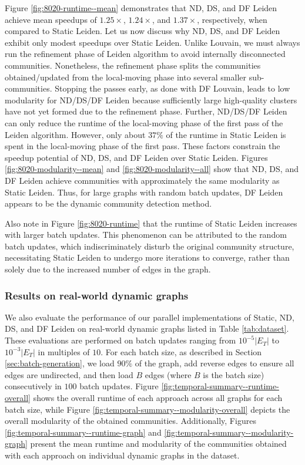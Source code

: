 Figure \ref{fig:8020-runtime--mean} demonstrates that ND, DS, and DF Leiden achieve mean speedups of $1.25\times$, $1.24\times$, and $1.37\times$, respectively, when compared to Static Leiden. Let us now discuss why ND, DS, and DF Leiden exhibit only modest speedups over Static Leiden. Unlike Louvain, we must always run the refinement phase of Leiden algorithm to avoid internally disconnected communities. Nonetheless, the refinement phase splits the communities obtained/updated from the local-moving phase into several smaller sub-communities. Stopping the passes early, as done with DF Louvain, leads to low modularity for ND/DS/DF Leiden because sufficiently large high-quality clusters have not yet formed due to the refinement phase. Further, ND/DS/DF Leiden can only reduce the runtime of the local-moving phase of the first pass of the Leiden algorithm. However, only about $37\%$ of the runtime in Static Leiden is spent in the local-moving phase of the first pass. These factors constrain the speedup potential of ND, DS, and DF Leiden over Static Leiden. Figures \ref{fig:8020-modularity--mean} and \ref{fig:8020-modularity--all} show that ND, DS, and DF Leiden achieve communities with approximately the same modularity as Static Leiden. Thus, for large graphs with random batch updates, DF Leiden appears to be the dynamic community detection method.

Also note in Figure \ref{fig:8020-runtime} that the runtime of Static Leiden increases with larger batch updates. This phenomenon can be attributed to the random batch updates, which indiscriminately disturb the original community structure, necessitating Static Leiden to undergo more iterations to converge, rather than solely due to the increased number of edges in the graph.


\subsubsection{Results on real-world dynamic graphs}

We also evaluate the performance of our parallel implementations of Static, ND, DS, and DF Leiden on real-world dynamic graphs listed in Table \ref{tab:dataset}. These evaluations are performed on batch updates ranging from $10^{-5}|E_T|$ to $10^{-3}|E_T|$ in multiples of $10$. For each batch size, as described in Section \ref{sec:batch-generation}, we load $90\%$ of the graph, add reverse edges to ensure all edges are undirected, and then load $B$ edges (where $B$ is the batch size) consecutively in $100$ batch updates. Figure \ref{fig:temporal-summary--runtime-overall} shows the overall runtime of each approach across all graphs for each batch size, while Figure \ref{fig:temporal-summary--modularity-overall} depicts the overall modularity of the obtained communities. Additionally, Figures \ref{fig:temporal-summary--runtime-graph} and \ref{fig:temporal-summary--modularity-graph} present the mean runtime and modularity of the communities obtained with each approach on individual dynamic graphs in the dataset.

